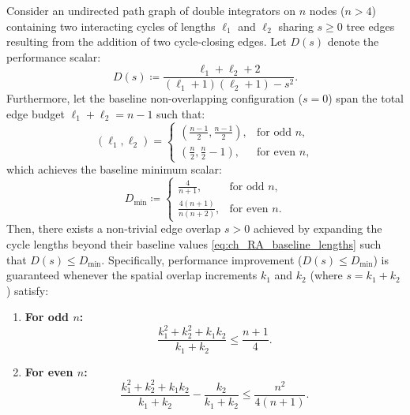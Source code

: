 \documentclass[openright,twoside]{iitbthesis}
\begin{document}
\begin{theo}\label{overlap}
Consider an undirected path graph of double integrators on $n$ nodes ($n > 4$) containing two interacting cycles of lengths $\ell_1$ and $\ell_2$ sharing $s \ge 0$ tree edges resulting from the addition of two cycle-closing edges. Let $D(s)$ denote the performance scalar:
\begin{equation}\label{eq:ch_RA_Ds_def}
	D(s) \coloneqq \frac{\ell_1 + \ell_2 + 2}{(\ell_1+1)(\ell_2+1) - s^2}.
\end{equation}
Furthermore, let the baseline non-overlapping configuration ($s = 0$) span the total edge budget $\ell_1 + \ell_2 = n-1$ such that:
\begin{equation}\label{eq:ch_RA_baseline_lengths}
	(\ell_1, \ell_2) = \begin{cases} \left(\frac{n-1}{2}, \frac{n-1}{2}\right), & \text{for odd } n, \\[6pt] \left(\frac{n}{2}, \frac{n}{2}-1\right), & \text{for even } n, \end{cases}
\end{equation}
which achieves the baseline minimum scalar:
\begin{equation}
	D_{\min} \coloneqq \begin{cases} \frac{4}{n+1}, & \text{for odd } n, \\[6pt] \frac{4(n+1)}{n(n+2)}, & \text{for even } n. \end{cases}
\end{equation}
Then, there exists a non-trivial edge overlap $s > 0$ achieved by expanding the cycle lengths beyond their baseline values \eqref{eq:ch_RA_baseline_lengths} such that $D(s) \le D_{\min}$. Specifically, performance improvement ($D(s) \le D_{\min}$) is guaranteed whenever the spatial overlap increments $k_1$ and $k_2$ (where $s = k_1 + k_2$) satisfy:
\begin{enumerate}
	\item \textbf{For odd $n$:}
	\begin{equation}\label{odd_minD}
		\frac{k_1^2 + k_2^2 + k_1 k_2}{k_1 + k_2} \le \frac{n+1}{4}.
	\end{equation}
	\item \textbf{For even $n$:}
	\begin{equation}\label{even_minD}
		\frac{k_1^2 + k_2^2 + k_1 k_2}{k_1 + k_2} - \frac{k_2}{k_1 + k_2} \le \frac{n^2}{4(n+1)}.
	\end{equation}
\end{enumerate}
\end{theo}
\end{document}
